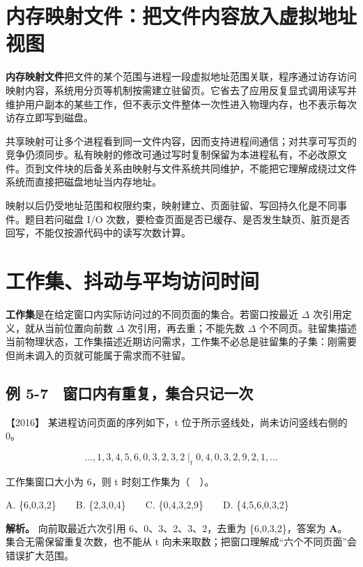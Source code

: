 \section{内存映射文件：把文件内容放入虚拟地址视图}\label{os-5-10}

\textbf{内存映射文件}把文件的某个范围与进程一段虚拟地址范围关联，程序通过访存访问映射内容，系统用分页等机制按需建立驻留页。它省去了应用反复显式调用读写并维护用户副本的某些工作，但不表示文件整体一次性进入物理内存，也不表示每次访存立即写到磁盘。

共享映射可让多个进程看到同一文件内容，因而支持进程间通信；对共享可写页的竞争仍须同步。私有映射的修改可通过写时复制保留为本进程私有，不必改原文件。页到文件块的后备关系由映射与文件系统共同维护，不能把它理解成绕过文件系统而直接把磁盘地址当内存地址。

映射以后仍受地址范围和权限约束，映射建立、页面驻留、写回持久化是不同事件。题目若问磁盘 I/O 次数，要检查页面是否已缓存、是否发生缺页、脏页是否回写，不能仅按源代码中的读写次数计算。

\section{工作集、抖动与平均访问时间}\label{os-5-11}

\textbf{工作集}是在给定窗口内实际访问过的不同页面的集合。若窗口按最近 \(\Delta\) 次引用定义，就从当前位置向前数 \(\Delta\) 次引用，再去重；不能先数 \(\Delta\) 个不同页。驻留集描述当前物理状态，工作集描述近期访问需求，工作集不必总是驻留集的子集：刚需要但尚未调入的页就可能属于需求而不驻留。

\subsection{例 5-7　窗口内有重复，集合只记一次}\label{os-ex5-7}

\noindent{}【2016】 某进程访问页面的序列如下，t 位于所示竖线处，尚未访问竖线右侧的 0。

\[\ldots,1,3,4,5,6,0,3,2,3,2\;\big|_{t}\;0,4,0,3,2,9,2,1,\ldots\]

工作集窗口大小为 6，则 t 时刻工作集为（　）。

A. \{6,0,3,2\}　　B. \{2,3,0,4\}　　C. \{0,4,3,2,9\}　　D. \{4,5,6,0,3,2\}


\textbf{解析。} 向前取最近六次引用 6、0、3、2、3、2，去重为 \{6,0,3,2\}，答案为 \textbf{A}。集合无需保留重复次数，也不能从 t 向未来取数；把窗口理解成``六个不同页面''会错误扩大范围。

